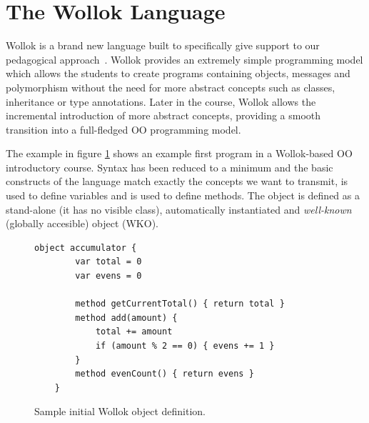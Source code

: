 \section{The Wollok Language}
\label{sec:wollokLanguage}


Wollok is a brand new language built to specifically give support to our pedagogical approach~\cite{lombardi_instances_2007,lombardi_carlos_alumnos_2008}. 
Wollok provides an extremely simple programming model which allows the students to create programs containing objects, messages and polymorphism without the need for more abstract concepts such as classes, inheritance or type annotations.
Later in the course, Wollok allows the incremental introduction of more abstract concepts,
providing a smooth transition into a full-fledged OO programming model.

The example in figure \ref{fig:helloWorld/wollok} shows an example first program in a Wollok-based OO introductory course.
Syntax has been reduced to a minimum and the basic constructs of the language match exactly the concepts we want to transmit, \eg {} is used to define variables and  is used to define methods.
The  object is defined as a stand-alone (\ie it has no visible class), automatically instantiated and \emph{well-known} (\ie globally accesible) object (WKO).

\vspace{-3mm}
\begin{figure}[ht]
 \centering
 \begin{lstlisting}[language=Wollok]
	object accumulator {
		var total = 0
		var evens = 0
		
		method getCurrentTotal() { return total }
		method add(amount) { 
			total += amount 
			if (amount % 2 == 0) { evens += 1 }
		}
		method evenCount() { return evens }
	}\end{lstlisting}
\vspace{-3mm}
\caption{\small Sample initial Wollok object definition.}
\label{fig:helloWorld/wollok}
\end{figure}


